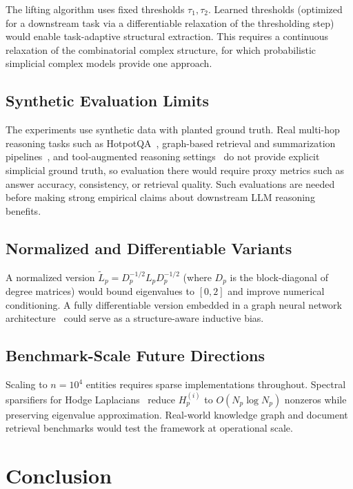 \documentclass[11pt]{article}
\theoremstyle{definition}
\theoremstyle{remark}
\begin{document}
The lifting algorithm uses fixed thresholds $\tau_1,\tau_2$. Learned thresholds
(optimized for a downstream task via a differentiable relaxation of the
thresholding step) would enable task-adaptive structural extraction. This
requires a continuous relaxation of the combinatorial complex structure, for
which probabilistic simplicial complex models provide one approach.

\subsection{Synthetic Evaluation Limits}

The experiments use synthetic data with planted ground truth. Real multi-hop
reasoning tasks such as HotpotQA~\cite{yang2018}, graph-based retrieval and
summarization pipelines~\cite{edge2024}, and tool-augmented reasoning
settings~\cite{yao2023,qin2023} do not provide explicit simplicial ground
truth, so evaluation there would require proxy metrics such as answer accuracy,
consistency, or retrieval quality. Such evaluations are needed before making
strong empirical claims about downstream LLM reasoning benefits.

\subsection{Normalized and Differentiable Variants}

A normalized version $\tilde{L}_p = D_p^{-1/2}L_p D_p^{-1/2}$ (where $D_p$ is
the block-diagonal of degree matrices) would bound eigenvalues to $[0,2]$ and
improve numerical conditioning. A fully differentiable version embedded in a
graph neural network architecture~\cite{schaub2020} could serve as a
structure-aware inductive bias.

\subsection{Benchmark-Scale Future Directions}

Scaling to $n=10^4$ entities requires sparse implementations throughout.
Spectral sparsifiers for Hodge Laplacians~\cite{horak2013} reduce $H_p^{(i)}$
to $O(N_p\log N_p)$ nonzeros while preserving eigenvalue approximation.
Real-world knowledge graph and document retrieval benchmarks would test the
framework at operational scale.


\clearpage
\section{Conclusion}
\label{sec:conclusion}
\end{document}
